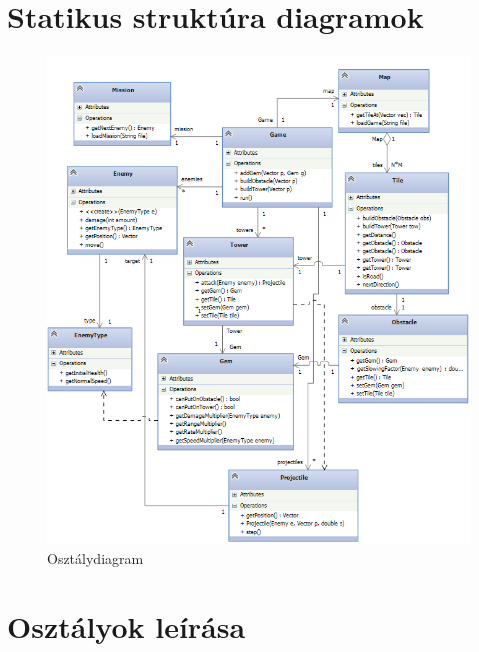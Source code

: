 \section{Statikus struktúra diagramok}

\begin{figure}[H]
\begin{center}
\includegraphics[width=17cm]{images/class.png}
\caption{Osztálydiagram}
\label{fig:class_diag}
\end{center}
\end{figure}


\section{Osztályok leírása}


